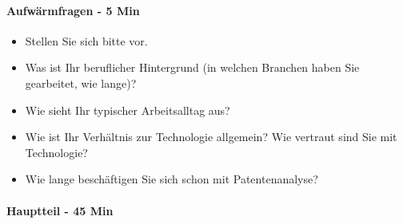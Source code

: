 \paragraph{Aufwärmfragen - 5 Min}

\begin{itemize}
\item Stellen Sie sich bitte vor.
\item Was ist Ihr beruflicher Hintergrund (in welchen Branchen haben Sie gearbeitet, wie lange)?
\item Wie sieht Ihr typischer Arbeitsalltag aus?
\item Wie ist Ihr Verhältnis zur Technologie allgemein? Wie vertraut sind Sie mit Technologie?
\item Wie lange beschäftigen Sie sich schon mit Patentenanalyse?
\end{itemize}

\paragraph{Hauptteil - 45 Min}

